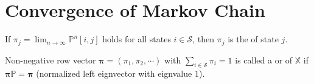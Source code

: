 \section{Convergence of Markov Chain}

\begin{definition}
If $ \pi_{j} = \lim_{n \to \infty} \mathbb{P}^{n} [i, j] $ holds for all states $ i \in \mathcal{S} $, then $ \pi_{j} $ is the  of state $ j $.

\begin{comment}
If all states $ i $ have limiting probability, then
\[ \lim_{n \to \infty} \mathbb{P}^{n} [i, j] =
\begin{bmatrix}
  \boldsymbol\pi \\ \vdots \\ \boldsymbol\pi
\end{bmatrix}, \]
where $ \boldsymbol\pi $ is the row vector $ (\pi_{1}, \pi_{2}, \cdots) $.
\end{comment}
\end{definition}

\begin{definition}
Non-negative row vector $ \boldsymbol\pi = (\pi_{1}, \pi_{2}, \cdots) $ with $ \sum_{i \in \mathcal{S}} \pi_{i} = 1 $ is called a  or  of $ \mathbb{X} $ if $ \boldsymbol\pi \mathbb{P} = \boldsymbol\pi $ (normalized left eignvector with eignvalue $ 1 $).

\begin{comment}
Why ``steady-state''?

If $ P(X(0) = i) = \pi_{i} $ for all $ i \in \mathcal{S} $, then
\begin{eqnarray*}
P(X(1) = i)
  & = & \sum_{i \in \mathcal{S}} P(X(1) = j \mid X(0) = i) \cdot P(X(0) = i) \\
  & = & \sum_{i \in \mathcal{S}} \pi_{i} \cdot \mathbb{P}[i, j] \\
  & = & \pi_{j},
\end{eqnarray*}
for all $ j \in \mathcal{S} $
\end{comment}
\end{definition}

